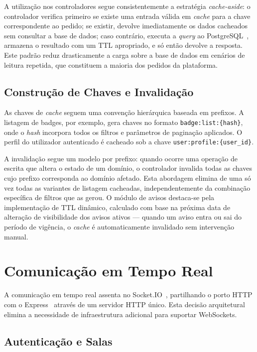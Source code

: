 \documentclass[12pt,a4paper]{report}
\begin{document}
A utilização nos controladores segue consistentemente a estratégia \textit{cache-aside}: o controlador verifica primeiro se existe uma entrada válida em \textit{cache} para a chave correspondente ao pedido; se existir, devolve imediatamente os dados cacheados sem consultar a base de dados; caso contrário, executa a \textit{query} ao PostgreSQL~\cite{postgresql}, armazena o resultado com um TTL apropriado, e só então devolve a resposta. Este padrão reduz drasticamente a carga sobre a base de dados em cenários de leitura repetida, que constituem a maioria dos pedidos da plataforma.

\subsection{Construção de Chaves e Invalidação}

As chaves de \textit{cache} seguem uma convenção hierárquica baseada em prefixos. A listagem de badges, por exemplo, gera chaves no formato \texttt{badge:list:\{hash\}}, onde o \textit{hash} incorpora todos os filtros e parâmetros de paginação aplicados. O perfil do utilizador autenticado é cacheado sob a chave \texttt{user:profile:\{user\_id\}}.

A invalidação segue um modelo por prefixo: quando ocorre uma operação de escrita que altera o estado de um domínio, o controlador invalida todas as chaves cujo prefixo corresponda ao domínio afetado. Esta abordagem elimina de uma só vez todas as variantes de listagem cacheadas, independentemente da combinação específica de filtros que as gerou. O módulo de avisos destaca-se pela implementação de TTL dinâmico, calculado com base na próxima data de alteração de visibilidade dos avisos ativos --- quando um aviso entra ou sai do período de vigência, o \textit{cache} é automaticamente invalidado sem intervenção manual.

\section{Comunicação em Tempo Real}

A comunicação em tempo real assenta no Socket.IO~\cite{socketio}, partilhando o porto HTTP com o Express~\cite{expressjs} através de um servidor HTTP único. Esta decisão arquitetural elimina a necessidade de infraestrutura adicional para suportar WebSockets.

\subsection{Autenticação e Salas}
\end{document}
